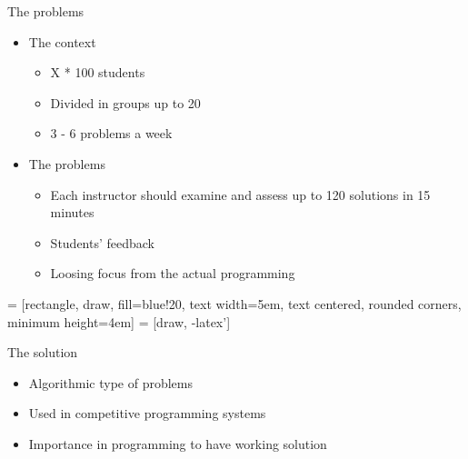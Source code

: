 \begin{frame}{The problems}
	\begin{itemize}[<+-| alert@+>]
	  \item The context
	  \begin{itemize}
	  	\item X * 100 students
	  	\item Divided in groups up to 20
	  	\item 3 - 6 problems a week
		\end{itemize}
		\item The problems
	  \begin{itemize}
	  \item Each  instructor should examine and assess up to 120 solutions in 15
	  minutes
	  \item Students' feedback
	  \item Loosing focus from the actual programming
	 \end{itemize}
	\end{itemize}
\end{frame}

 = [rectangle, draw, fill=blue!20,
text width=5em, text centered, rounded corners, minimum height=4em]
 = [draw, -latex']

\begin{frame}[fragile]{The solution}
	\begin{itemize}
  	  \item Algorithmic type of problems 
	\end{itemize}
\begin{center}
\end{center}
\pause
\begin{itemize}[<+->]
  \item Used in competitive programming systems
  \item Importance in programming to have working solution 
\end{itemize}
\end{frame}

